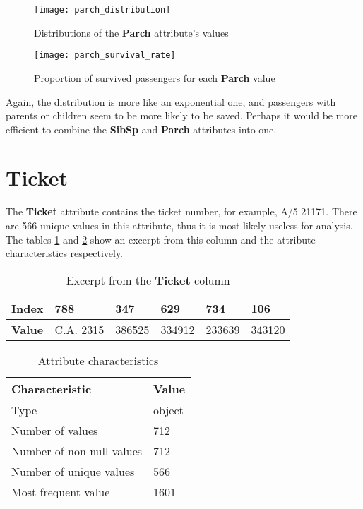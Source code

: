 \begin{figure}[!ht]
    \centering
    \texttt{[image: parch\_distribution]}
    \caption{Distributions of the \textbf{Parch} attribute's values}
    \label{pic:parch_distribution}
\end{figure}

\begin{figure}[!ht]
    \centering
    \texttt{[image: parch\_survival\_rate]}
    \caption{Proportion of survived passengers for each \textbf{Parch} value}
    \label{pic:parch_survival_rate}
\end{figure}

Again, the distribution is more like an exponential one, and passengers 
with parents or children seem to be more likely to be saved. Perhaps it 
would be more efficient to combine the \textbf{SibSp} and \textbf{Parch} 
attributes into one.


\section{Ticket} \label{section:Ticket}
The \textbf{Ticket} attribute contains the ticket number, for example, 
A/5 21171. There are 566 unique values in this attribute, thus it is most
likely useless for analysis. The tables \ref{table:ticket_head} and 
\ref{table:ticket_characteristics} show an excerpt from this column and 
the attribute characteristics respectively.

\begin{table}[!ht]
    \centering
    \caption{Excerpt from the \textbf{Ticket} column}
    \begin{tabular}{|l|l|l|l|l|l|}
        \hline
        \textbf{Index} & 788       & 347    & 629    & 734    & 106    \\ \hline
        \textbf{Value} & C.A. 2315 & 386525 & 334912 & 233639 & 343120 \\ \hline
    \end{tabular}
    \label{table:ticket_head}
\end{table}

\begin{table}[!ht]
    \centering
    \caption{Attribute characteristics}
    \begin{tabular}{|l|l|}
        \hline
        \textbf{Characteristic}   & \textbf{Value} \\ \hline
        Type                      & object         \\ \hline
        Number of values          & 712            \\ \hline
        Number of non-null values & 712            \\ \hline
        Number of unique values   & 566            \\ \hline
        Most frequent value       & 1601           \\ \hline
    \end{tabular}
    \label{table:ticket_characteristics}
\end{table}


